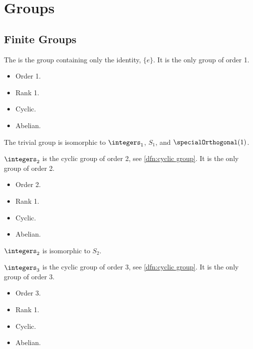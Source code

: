 \chapter{Groups}
\section{Finite Groups}

\begin{dfn}{}{}
    The  is the group containing only the identity, \(\{e\}\).
    It is the only group of order 1.
    
    
    \begin{multicols}{2}
        \begin{itemize}
            \item Order 1.
            \item Rank 1.
            \item Cyclic.
            \item Abelian.
        \end{itemize}
    \end{multicols}
    The trivial group is isomorphic to \(\integers_1\), \(S_1\), and \(\specialOrthogonal(1)\).
\end{dfn}

\begin{dfn}{}{}
    \(\integers_2\) is the cyclic group of order 2, see \cref{dfn:cyclic group}.
    It is the only group of order 2.
    
    
    \begin{multicols}{2}
        \begin{itemize}
            \item Order 2.
            \item Rank 1.
            \item Cyclic.
            \item Abelian.
        \end{itemize}
    \end{multicols}
    \(\integers_2\) is isomorphic to \(S_2\).
\end{dfn}

\begin{dfn}{}{}
    \(\integers_3\) is the cyclic group of order 3, see \cref{dfn:cyclic group}.
    It is the only group of order 3.
    
    \begin{multicols}{2}
        \begin{itemize}
            \item Order 3.
            \item Rank 1.
            \item Cyclic.
            \item Abelian.
        \end{itemize}
    \end{multicols}
\end{dfn}

